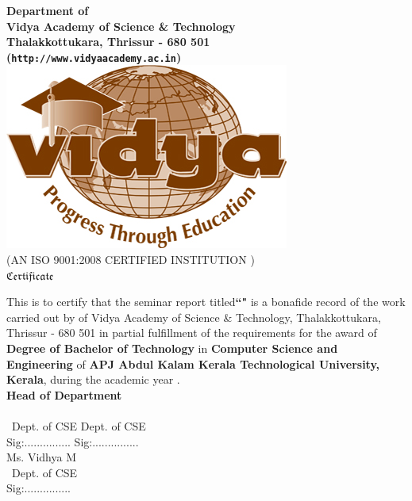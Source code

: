



\begin{titlepage}


\begin{center}


{\Large \bf Department of \vdept  }\\
{\Large \bf Vidya Academy of Science \& Technology}\\
{\normalsize \bf Thalakkottukara, Thrissur - 680 501\\
({\tt http://www.vidyaacademy.ac.in})}\\[0.75cm]
%
%
\includegraphics[width=3.5 cm]{VidyaLogo.JPG}\\
\scriptsize (AN ISO 9001:2008 CERTIFIED INSTITUTION )\\[1 cm]
%
 \Huge  $ \mathfrak{Certificate}$\\[0.5cm]
%
\end{center}

\quad This is to certify that the seminar report titled{\bf ``\vtitle"} is a bonafide record of the work carried out by {\bf \vauthor } of Vidya Academy of Science \& Technology, Thalakkottukara, Thrissur - 680 501 in partial fulfillment of the requirements for the award of  {\bf Degree of Bachelor of Technology} in {\bf Computer Science and Engineering} of  {\bf APJ Abdul Kalam Kerala Technological University, Kerala}, during the academic year \vacademicyear.\\[1 cm]
 
 \hfill  {\bf Head of Department} \\[.3cm]
\noindent \vguide \hfill \vhod \\ \vguidedg\ Dept. of CSE \hfill Dept. of CSE \\
Sig:...............  \hfill  Sig:............... \\[.25 cm]
\noindent Ms. Vidhya M\\
\vguidedg\, Dept. of CSE \\
Sig:............... 




%
\end{titlepage}

%  